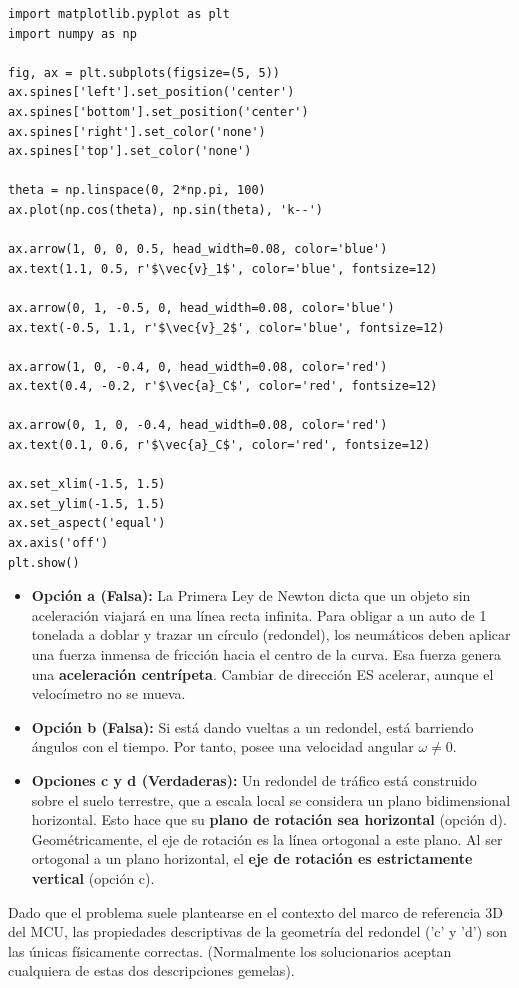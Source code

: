 \documentclass[12pt, a4paper]{article}
\begin{document}
\begin{verbatim}
import matplotlib.pyplot as plt
import numpy as np

fig, ax = plt.subplots(figsize=(5, 5))
ax.spines['left'].set_position('center')
ax.spines['bottom'].set_position('center')
ax.spines['right'].set_color('none')
ax.spines['top'].set_color('none')

theta = np.linspace(0, 2*np.pi, 100)
ax.plot(np.cos(theta), np.sin(theta), 'k--')

ax.arrow(1, 0, 0, 0.5, head_width=0.08, color='blue')
ax.text(1.1, 0.5, r'$\vec{v}_1$', color='blue', fontsize=12)

ax.arrow(0, 1, -0.5, 0, head_width=0.08, color='blue')
ax.text(-0.5, 1.1, r'$\vec{v}_2$', color='blue', fontsize=12)

ax.arrow(1, 0, -0.4, 0, head_width=0.08, color='red')
ax.text(0.4, -0.2, r'$\vec{a}_C$', color='red', fontsize=12)

ax.arrow(0, 1, 0, -0.4, head_width=0.08, color='red')
ax.text(0.1, 0.6, r'$\vec{a}_C$', color='red', fontsize=12)

ax.set_xlim(-1.5, 1.5)
ax.set_ylim(-1.5, 1.5)
ax.set_aspect('equal')
ax.axis('off')
plt.show()
\end{verbatim}

\begin{itemize}
    \item \textbf{Opción a (Falsa):} La Primera Ley de Newton dicta que un objeto sin aceleración viajará en una línea recta infinita. Para obligar a un auto de 1 tonelada a doblar y trazar un círculo (redondel), los neumáticos deben aplicar una fuerza inmensa de fricción hacia el centro de la curva. Esa fuerza genera una \textbf{aceleración centrípeta}. Cambiar de dirección ES acelerar, aunque el velocímetro no se mueva.
    \item \textbf{Opción b (Falsa):} Si está dando vueltas a un redondel, está barriendo ángulos con el tiempo. Por tanto, posee una velocidad angular $\omega \neq 0$.
    \item \textbf{Opciones c y d (Verdaderas):} Un redondel de tráfico está construido sobre el suelo terrestre, que a escala local se considera un plano bidimensional horizontal. Esto hace que su \textbf{plano de rotación sea horizontal} (opción d). Geométricamente, el eje de rotación es la línea ortogonal a este plano. Al ser ortogonal a un plano horizontal, el \textbf{eje de rotación es estrictamente vertical} (opción c).
\end{itemize}
Dado que el problema suele plantearse en el contexto del marco de referencia 3D del MCU, las propiedades descriptivas de la geometría del redondel ('c' y 'd') son las únicas físicamente correctas. (Normalmente los solucionarios aceptan cualquiera de estas dos descripciones gemelas).
\end{document}
